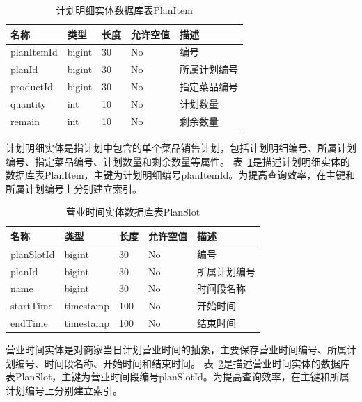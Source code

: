 \begin{table}[htbp!]\footnotesize
  \centering
  \caption{计划明细实体数据库表PlanItem}
  \vspace{2mm}
  \begin{tabular}{lllll}
  \toprule
  \textbf{名称}&\textbf{类型}&\textbf{长度}&\textbf{允许空值}&\textbf{描述}\\
  \midrule 
  planItemId& bigint& 30& No& 编号\\
  \hline
  planId& bigint& 30& No& 所属计划编号\\
  \hline
  productId& bigint& 30& No& 指定菜品编号\\
  \hline
  quantity& int& 10& No& 计划数量\\
  \hline
  remain& int& 10& No& 剩余数量\\
  \bottomrule
  \end{tabular}
  \label{table:ER8}
\end{table}

计划明细实体是指计划中包含的单个菜品销售计划，包括计划明细编号、所属计划编号、指定菜品编号、计划数量和剩余数量等属性。
表~\ref{table:ER8}是描述计划明细实体的数据库表PlanItem，主键为计划明细编号planItemId。为提高查询效率，在主键和所属计划编号上分别建立索引。

\begin{table}[htbp!]\footnotesize
  \centering
  \caption{营业时间实体数据库表PlanSlot}
  \vspace{2mm}
  \begin{tabular}{lllll}
  \toprule
  \textbf{名称}&\textbf{类型}&\textbf{长度}&\textbf{允许空值}&\textbf{描述}\\
  \midrule 
  planSlotId& bigint& 30& No& 编号\\
  \hline
  planId& bigint& 30& No& 所属计划编号\\
  \hline
  name& bigint& 30& No& 时间段名称\\
  \hline
  startTime& timestamp& 100& No& 开始时间\\
  \hline
  endTime& timestamp& 100& No& 结束时间\\
  \bottomrule
  \end{tabular}
  \label{table:ER9}
\end{table}

营业时间实体是对商家当日计划营业时间的抽象，主要保存营业时间编号、所属计划编号、时间段名称、开始时间和结束时间。
表~\ref{table:ER9}是描述营业时间实体的数据库表PlanSlot，主键为营业时间段编号planSlotId。为提高查询效率，在主键和所属计划编号上分别建立索引。

